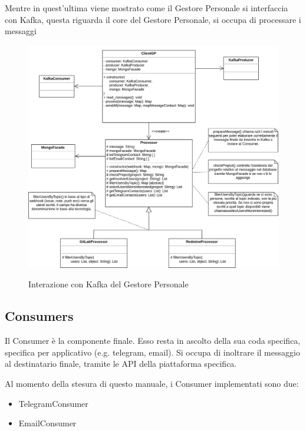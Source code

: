 Mentre in quest'ultima viene mostrato come il Gestore Personale si interfaccia con Kafka, questa riguarda il core del Gestore Personale, si occupa di processare
i messaggi

\begin{figure}[H]
    \centering
    \includegraphics[width=\textwidth]{img/GP-Kafka.png}\\
    \caption{Interazione con Kafka del Gestore Personale}
    \label{fig:GP-Kafka}
\end{figure}

\subsection{Consumers}
Il Consumer è la componente finale. Esso resta in ascolto della sua coda specifica, specifica per applicativo (e.g. telegram, email).
Si occupa di inoltrare il messaggio al destinatario finale, tramite le API della piattaforma specifica.

Al momento della stesura di questo manuale, i Consumer implementati sono due:
\begin{itemize}
    \item TelegramConsumer
    \item EmailConsumer
\end{itemize}

